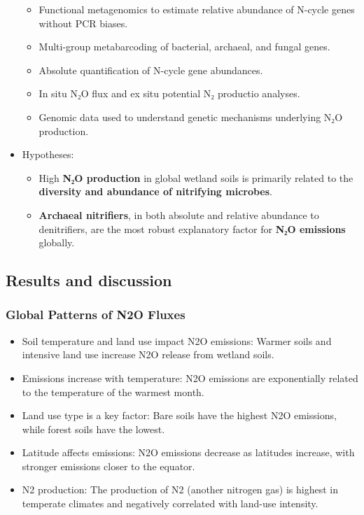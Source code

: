 \documentclass[
]{article}
\providecommand{\tightlist}{%
  \setlength{\itemsep}{0pt}\setlength{\parskip}{0pt}}
\begin{document}
\begin{itemize}
  \begin{itemize}
  \tightlist
  \item
    Functional metagenomics to estimate relative abundance of N-cycle
    genes without PCR biases.
  \item
    Multi-group metabarcoding of bacterial, archaeal, and fungal genes.
  \item
    Absolute quantification of N-cycle gene abundances.
  \item
    In situ N₂O flux and ex situ potential N₂ productio analyses.
  \item
    Genomic data used to understand genetic mechanisms underlying N₂O
    production.
  \end{itemize}
\item
  Hypotheses:

  \begin{itemize}
  \tightlist
  \item
    High \textbf{N₂O production} in global wetland soils is primarily
    related to the \textbf{diversity and abundance of nitrifying
    microbes}.
  \item
    \textbf{Archaeal nitrifiers}, in both absolute and relative
    abundance to denitrifiers, are the most robust explanatory factor
    for \textbf{N₂O emissions} globally.
  \end{itemize}
\end{itemize}

\hypertarget{results-and-discussion}{%
\subsection{Results and discussion}\label{results-and-discussion}}

\hypertarget{global-patterns-of-n2o-fluxes}{%
\subsubsection{\texorpdfstring{\textbf{Global Patterns of N2O
Fluxes}}{Global Patterns of N2O Fluxes}}\label{global-patterns-of-n2o-fluxes}}

\begin{itemize}
\tightlist
\item
  Soil temperature and land use impact N2O emissions: Warmer soils and
  intensive land use increase N2O release from wetland soils.
\item
  Emissions increase with temperature: N2O emissions are exponentially
  related to the temperature of the warmest month.
\item
  Land use type is a key factor: Bare soils have the highest N2O
  emissions, while forest soils have the lowest.
\item
  Latitude affects emissions: N2O emissions decrease as latitudes
  increase, with stronger emissions closer to the equator.
\item
  N2 production: The production of N2 (another nitrogen gas) is highest
  in temperate climates and negatively correlated with land-use
  intensity.
\end{itemize}
\end{document}
